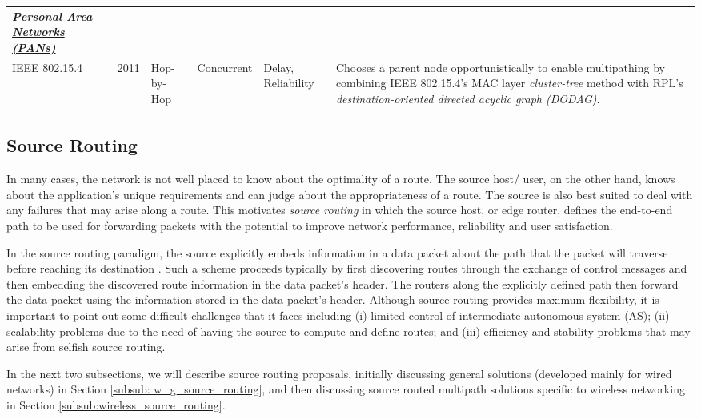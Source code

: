 \documentclass[10pt]{IEEEtran}
\begin{document}
\begin{table*}
\begin{tabular}{p{2.7cm}p{0.3cm}p{1.58cm}p{.8cm}p{2.1cm}p{7.6cm}}
\textbf{\textit{\underline{Personal Area Networks (PANs)}}}\\

IEEE 802.15.4 \cite{pavkovic2011multipath} & 2011 & Hop-by-Hop & Concurrent & Delay, Reliability & Chooses a parent node opportunistically to enable multipathing by combining IEEE 802.15.4's MAC layer \emph{cluster-tree} method with RPL's \emph{destination-oriented directed acyclic graph (DODAG)}.\\

\bottomrule
\end{tabular}
\label{tab:MultipathRoutingWireless}
\end{table*}


\subsection{Source Routing}
\label{subsec:source_routing}

In many cases, the network is not well placed to know about the optimality of a route. The source host/ user, on the other hand, knows about the application's unique requirements and can judge about the appropriateness of a route. The source is also best suited to deal with any failures that may arise along a route. This motivates \textit{source routing} in which the source host, or edge router, defines the end-to-end path to be used for forwarding packets with the potential to improve network performance, reliability and user satisfaction.  

In the source routing paradigm, the source explicitly embeds information in a data packet about the path that the packet will traverse before reaching its destination \cite{yang2006source}. Such a scheme proceeds typically by first discovering routes through the exchange of control messages and then embedding the discovered route information in the data packet's header. The routers along the explicitly defined path then forward the data packet using the information stored in the data packet's header. Although source routing provides maximum flexibility, it is important to point out some difficult challenges that it faces \cite{xu2006miro} including (i) limited control of intermediate autonomous system (AS); (ii) scalability problems due to the need of having the source to compute and define routes; and (iii) efficiency and stability problems that may arise from selfish source routing.

In the next two subsections, we will describe source routing proposals, initially discussing general solutions (developed mainly for wired networks) in Section \ref{subsub: w_g_source_routing}, and then discussing source routed multipath solutions specific to wireless networking in Section \ref{subsub:wireless_source_routing}.
\end{document}
